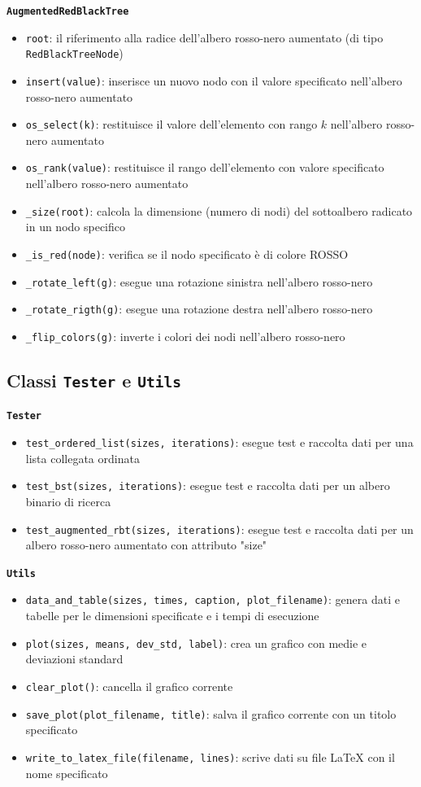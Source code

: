 \documentclass[onecolumn]{article}
\begin{document}
{\setlength{\parindent}{0em} \texttt{\textbf{AugmentedRedBlackTree}}}
\begin{itemize}
\setlength\itemsep{0em}
    \item \verb|root|: il riferimento alla radice dell'albero rosso-nero aumentato (di tipo \texttt{RedBlackTreeNode})
    \item \verb|insert(value)|: inserisce un nuovo nodo con il valore specificato nell'albero rosso-nero aumentato
    \item \verb|os_select(k)|: restituisce il valore dell'elemento con rango $k$ nell'albero rosso-nero aumentato
    \item \verb|os_rank(value)|: restituisce il rango dell'elemento con valore specificato nell'albero rosso-nero aumentato
    \item \verb|_size(root)|: calcola la dimensione (numero di nodi) del sottoalbero radicato in un nodo specifico
    \item \verb|_is_red(node)|: verifica se il nodo specificato è di colore ROSSO
    \item \verb|_rotate_left(g)|: esegue una rotazione sinistra nell'albero rosso-nero
    \item \verb|_rotate_rigth(g)|: esegue una rotazione destra nell'albero rosso-nero
    \item \verb|_flip_colors(g)|: inverte i colori dei nodi nell'albero rosso-nero
\end{itemize}

\subsection{Classi \texttt{Tester} e \texttt{Utils}}
\texttt{\textbf{Tester}}
\begin{itemize}
\setlength\itemsep{0em}
    \item \verb|test_ordered_list(sizes, iterations)|: esegue test e raccolta dati per una lista collegata ordinata
    \item \verb|test_bst(sizes, iterations)|: esegue test e raccolta dati per un albero binario di ricerca
    \item \verb|test_augmented_rbt(sizes, iterations)|: esegue test e raccolta dati per un albero rosso-nero aumentato con attributo "size"
\end{itemize}

{\setlength{\parindent}{0em} \texttt{\textbf{Utils}}}
\begin{itemize}
\setlength\itemsep{0em}
    \item \verb|data_and_table(sizes, times, caption, plot_filename)|: genera dati e tabelle per le dimensioni specificate e i tempi di esecuzione
    \item \verb|plot(sizes, means, dev_std, label)|: crea un grafico con medie e deviazioni standard
    \item \verb|clear_plot()|: cancella il grafico corrente
    \item \verb|save_plot(plot_filename, title)|: salva il grafico corrente con un titolo specificato
    \item \verb|write_to_latex_file(filename, lines)|: scrive dati su file LaTeX con il nome specificato
\end{itemize}
\end{document}
